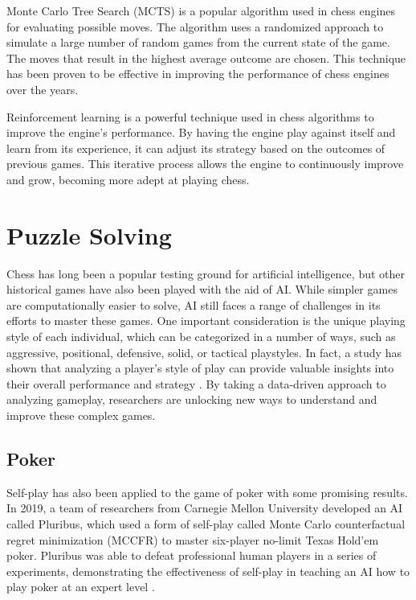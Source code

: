 \begin{spacing}{2.0}
Monte Carlo Tree Search (MCTS) is a popular algorithm used in chess engines for evaluating possible moves. The algorithm uses a randomized approach to simulate a large number of random games from the current state of the game. The moves that result in the highest average outcome are chosen. This technique has been proven to be effective in improving the performance of chess engines over the years.

Reinforcement learning is a powerful technique used in chess algorithms to improve the engine's performance. By having the engine play against itself and learn from its experience, it can adjust its strategy based on the outcomes of previous games. This iterative process allows the engine to continuously improve and grow, becoming more adept at playing chess.

\section{Puzzle Solving}

Chess has long been a popular testing ground for artificial intelligence, but other historical games have also been played with the aid of AI. While simpler games are computationally easier to solve, AI still faces a range of challenges in its efforts to master these games. One important consideration is the unique playing style of each individual, which can be categorized in a number of ways, such as aggressive, positional, defensive, solid, or tactical playstyles. In fact, a study has shown that analyzing a player's style of play can provide valuable insights into their overall performance and strategy \cite{Classification}. By taking a data-driven approach to analyzing gameplay, researchers are unlocking new ways to understand and improve these complex games.

\subsection{Poker}

Self-play has also been applied to the game of poker with some promising results. In 2019, a team of researchers from Carnegie Mellon University developed an AI called Pluribus, which used a form of self-play called Monte Carlo counterfactual regret minimization (MCCFR) to master six-player no-limit Texas Hold'em poker. Pluribus was able to defeat professional human players in a series of experiments, demonstrating the effectiveness of self-play in teaching an AI how to play poker at an expert level \cite{Brown2019SuperhumanPA}.


\end{spacing}
